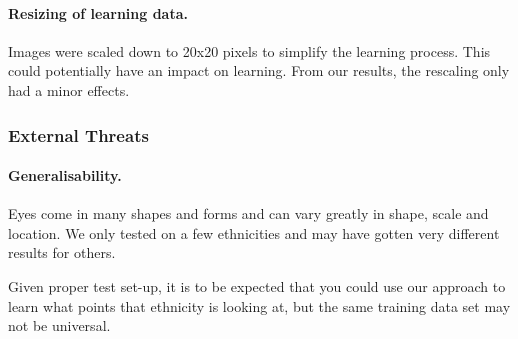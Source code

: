 \paragraph{Resizing of learning data.}
Images were scaled down to 20x20 pixels to simplify the learning process.
This could potentially have an impact on learning.
From our results, the rescaling only had a minor effects.

\subsubsection{External Threats}
\paragraph{Generalisability.}
Eyes come in many shapes and forms and can vary greatly in shape, scale and location.
We only tested on a few ethnicities and may have gotten very different results for others.

Given proper test set-up, it is to be expected that you could use our approach to learn what points that ethnicity is looking at, but the same training data set may not be universal.